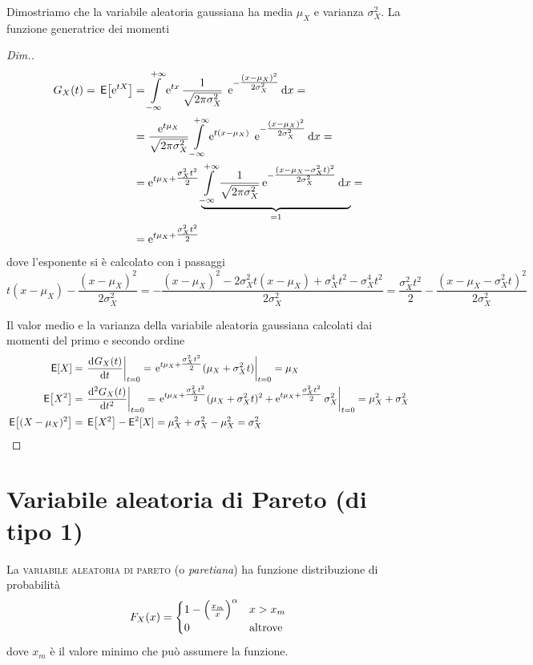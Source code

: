 Dimostriamo che la variabile aleatoria gaussiana ha media $\mu_X$ e varianza $\sigma^2_X$. La funzione generatrice dei momenti
\begin{proof}[Dim.]
\[\begin{split}G_X(t)=\,{\operatorname{\mathsf{E}}}\!\left[{\operatorname{e}^{t X}}\right]&=\int\limits_{-\infty}^{+\infty}{\operatorname{e}^{t x}\frac{1}{\sqrt{2\pi\sigma^2_X}}\;\operatorname{e}^{-\tfrac{(x-\mu_X)^2}{2\sigma^2_X}}}{\,\mathop{}\!\mathrm{d}{x}}=\\
&=\frac{\operatorname{e}^{t\mu_X}}{\sqrt{2\pi\sigma^2_X}}\int\limits_{-\infty}^{+\infty}{\operatorname{e}^{t (x-\mu_X)}\;\operatorname{e}^{-\tfrac{(x-\mu_X)^2}{2\sigma^2_X}}}{\,\mathop{}\!\mathrm{d}{x}}=\\
&=\operatorname{e}^{t\mu_X+\tfrac{\sigma^2_X t^2}{2}}\underbrace{\int\limits_{-\infty}^{+\infty}{\frac{1}{\sqrt{2\pi\sigma^2_X}}\operatorname{e}^{-\tfrac{(x-\mu_X-\sigma^2_X t)^2}{2\sigma^2_X}}}{\,\mathop{}\!\mathrm{d}{x}}}_{=1}=\\
&=\operatorname{e}^{t\mu_X+\tfrac{\sigma^2_X t^2}{2}}\end{split}\]
dove l'esponente si è calcolato con i passaggi
\[t(x-\mu_X)-\frac{(x-\mu_X)^2}{2\sigma^2_X}=-\frac{(x-\mu_X)^2-2\sigma^2_X t(x-\mu_X)+\sigma^4_X t^2-\sigma^4_X t^2}{2\sigma^2_X}=\frac{\sigma^2_X t^2}{2}-\frac{(x-\mu_X-\sigma^2_X t)^2}{2\sigma^2_X}\]

Il valor medio e la varianza della variabile aleatoria gaussiana calcolati dai momenti del primo e secondo ordine
\begin{equation}\begin{split}
\E{X}&=\restrict{\deriv{G_X(t)}{t}}{t=0}=\restrict{\e{t\mu_X+\tfrac{\sigma^2_X t^2}{2}}(\mu_X+\sigma^2_X t)}{t=0}=\mu_X
\\
\E{X^2}&=\restrict{\deriv[2]{G_X(t)}{t}}{t=0}=\restrict{\e{t\mu_X+\tfrac{\sigma^2_X t^2}{2}}(\mu_X+\sigma^2_X t)^2+\e{t\mu_X+\tfrac{\sigma^2_X t^2}{2}}\sigma^2_X}{t=0}=\mu^2_X+\sigma^2_X
\\\E{(X-\mu_X)^2}&=\E{X^2}-\Esp^2[X]=\mu^2_X+\sigma^2_X-\mu^2_X=\sigma^2_X
\end{split}
\end{equation}
\end{proof}

\section{Variabile aleatoria di Pareto (di tipo 1)}
La \textsc{variabile aleatoria di pareto} (o \emph{paretiana}) ha funzione distribuzione
di probabilità
\begin{equation}
	F_X(x) =
	\begin{cases}
		1-\Bigl(\frac{x_m}{x}\Bigr)^\alpha & x > x_m \\
		0 & \text{altrove}
	\end{cases}
\end{equation}
dove \(x_m\) è il valore minimo che può assumere la funzione.

